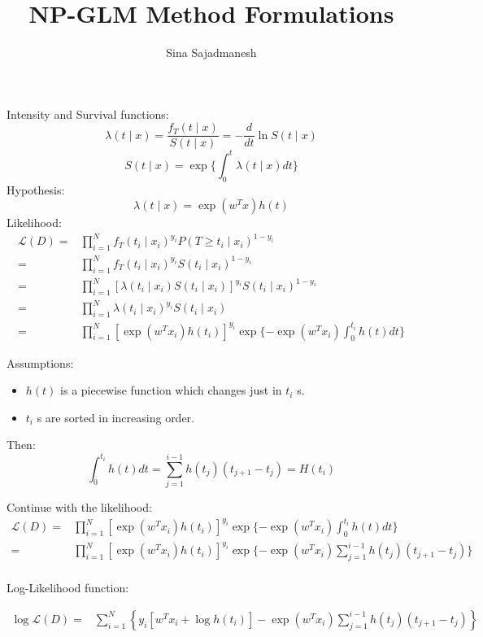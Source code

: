\documentclass[]{article}
\title{NP-GLM Method Formulations}
\author{Sina Sajadmanesh}
\begin{document}
\maketitle

Intensity and Survival functions:
\[\lambda(t\mid x)=\frac{f_T(t\mid x)}{S(t\mid x)}=-\frac{d}{dt}\ln S(t\mid x) \]
\[S(t\mid x)=\exp\{\int_{0}^{t}\lambda(t\mid x)dt\}\]
Hypothesis: 
\[\lambda(t\mid x)=\exp(w^Tx)h(t)\]
Likelihood:
\begin{equation*}
\begin{split}
\mathcal{L}(D)=&\prod_{i=1}^{N}f_T(t_i\mid x_i)^{y_i}P(T\ge t_i\mid x_i)^{1-y_i}\\
=&\prod_{i=1}^{N}f_T(t_i\mid x_i)^{y_i}S(t_i\mid x_i)^{1-y_i}\\
=&\prod_{i=1}^{N}[\lambda(t_i\mid x_i)S(t_i\mid x_i)]^{y_i}S(t_i\mid x_i)^{1-y_i}\\
=&\prod_{i=1}^{N}\lambda(t_i\mid x_i)^{y_i}S(t_i\mid x_i)\\
=&\prod_{i=1}^{N}\left[\exp(w^Tx_i)h(t_i)\right]^{y_i}\exp\lbrace-\exp(w^Tx_i)\int_{0}^{t_i}h(t)dt\rbrace
\end{split}
\end{equation*}

Assumptions:
\begin{itemize}
\item $h(t)$ is a piecewise function which changes just in $t_i$ s.
\item $t_i$ s are sorted in increasing order.
\end{itemize}

Then:
\[\int_{0}^{t_i}h(t)dt = \sum_{j=1}^{i-1}h(t_j)(t_{j+1}-t_j)=H(t_i)\]

Continue with the likelihood:
\begin{equation*}
\begin{split}
\mathcal{L}(D)
=&\prod_{i=1}^{N}\left[\exp(w^Tx_i)h(t_i)\right]^{y_i}\exp\lbrace-\exp(w^Tx_i)\int_{0}^{t_i}h(t)dt\rbrace\\
=&\prod_{i=1}^{N}\left[\exp(w^Tx_i)h(t_i)\right]^{y_i}\exp\lbrace-\exp(w^Tx_i)\sum_{j=1}^{i-1}h(t_j)(t_{j+1}-t_j)\rbrace\\
\end{split}
\end{equation*}

Log-Likelihood function:

\begin{equation*}
\begin{split}
\log\mathcal{L}(D)
=&\sum_{i=1}^{N}\left\lbrace y_i\left[w^Tx_i + \log h(t_i)\right]-\exp(w^Tx_i)\sum_{j=1}^{i-1}h(t_j)(t_{j+1}-t_j)\right\rbrace\\
\end{split}
\end{equation*}
\end{document}

